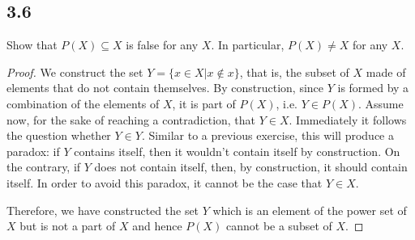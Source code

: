 \subsection*{3.6}

Show that $P(X) \subseteq X$ is false for any $X$. In particular, $P(X) \neq X$ for any $X$.

\begin{proof}
We construct the set $Y=\{x \in X | x \notin x\}$, that is, the subset of $X$ made of elements that do not contain themselves. By construction, since $Y$ is formed by a combination of the elements of $X$, it is part of $P(X)$, i.e. $Y \in P(X)$. Assume now, for the sake of reaching a contradiction, that $Y \in X$. Immediately it follows the question whether $Y \in Y$. Similar to a previous exercise, this will produce a paradox: if $Y$ contains itself, then it wouldn't contain itself by construction. On the contrary, if $Y$ does not contain itself, then, by construction, it should contain itself. In order to avoid this paradox, it cannot be the case that $Y \in X$.

Therefore, we have constructed the set $Y$ which is an element of the power set of $X$ but is not a part of $X$ and hence $P(X)$ cannot be a subset of $X$.
\end{proof}

\newpage

